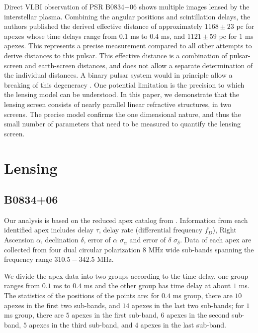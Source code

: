 \documentclass[useAMS,usenatbib]{mn2e}
\begin{document}
Direct VLBI observation of PSR B0834+06 shows multiple images lensed
by the interstellar plasma.  Combining the angular positions and
scintillation delays, the authors published the derived effective
distance \citep{2010ApJ...708..232B} of approximately $1168\pm 23$ pc
for apexes whose time delays range from $0.1$ ms to $0.4$ ms, and
$1121\pm 59$ pc for $1$ ms apexes.  This represents a precise
measurement compared to all other attempts to derive distances to this
pulsar.  This effective distance is a combination of pulsar-screen and
earth-screen distances, and does not allow a separate determination of
the individual distances.  A binary pulsar system would in principle
allow a breaking of this degeneracy \citep{2014MNRAS.442.3338P}. One
potential limitation is the precision to which the lensing model can
be understood.  In this paper, we demonstrate that the lensing screen
consists of nearly parallel linear refractive structures, in two
screens.  The precise model confirms the one dimensional nature, and
thus the small number of parameters that need to be measured to
quantify the lensing screen. 

\section{Lensing}
\subsection{B0834+06}
\label{21}
Our analysis is based on the reduced apex catalog from
\citep{2010ApJ...708..232B}. Information from each identified apex includes delay $\tau$,
delay rate (differential frequency $f_D$), Right Ascension $\alpha$, declination $\delta$, error of $\alpha$ $\sigma_{\alpha}$ and error of $\delta$ $\sigma_{\delta}$. Data of each apex are collected from four dual circular polarization $8$ MHz wide sub-bands spanning the frequency range $310.5-342.5$ MHz. 

We divide the apex data into two groups according to the time delay, one group ranges from $0.1$ ms to $0.4$ ms and the other group has time delay at about $1$ ms. The statistics of the positions of the points are: for $0.4$ ms group, there are $10$ apexes in the first two sub-bands, and $14$ apexes in the last two sub-bands; for $1$ ms group, there are $5$ apexes in the first sub-band, $6$ apexes in the second sub-band, $5$ apexes in the third sub-band, and $4$ apexes in the last sub-band. 
\end{document}
